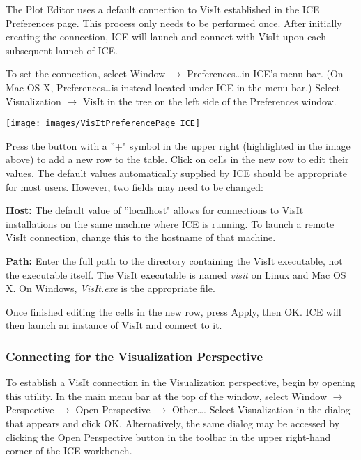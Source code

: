 The Plot Editor uses a default connection to VisIt established in the ICE
Preferences page. This process only needs to be performed once. After initially
creating the connection, ICE will launch and connect with VisIt upon each
subsequent launch of ICE.

To set the connection, select Window $\rightarrow$ Preferences\ldots in ICE's
menu bar. (On Mac OS X, Preferences\ldots is instead located under ICE in the
menu bar.) Select Visualization $\rightarrow$ VisIt in the tree on the left side
of the Preferences window.

\begin{center}
\texttt{[image: images/VisItPreferencePage\_ICE]}
\end{center}

Press the button with a ''+" symbol in the upper right (highlighted in the image
above) to add a new row to the table. Click on cells in the new row to edit
their values. The default values automatically supplied by ICE should be
appropriate for most users. However, two fields may need to be changed:

\textbf{Host:} The default value of ''localhost" allows for connections to VisIt
installations on the same machine where ICE is running. To launch a remote VisIt
connection, change this to the hostname of that machine.

\textbf{Path:} Enter the full path to the directory containing the VisIt
executable, not the executable itself. The VisIt executable is named
\textit{visit} on Linux and Mac OS X. On Windows, \textit{VisIt.exe} is the
appropriate file.

Once finished editing the cells in the new row, press Apply, then OK. ICE will
then launch an instance of VisIt and connect to it.

\subsubsection{Connecting for the Visualization Perspective} 

To establish a VisIt connection in the Visualization perspective, begin by
opening this utility. In the main menu bar at the top of the window, select
Window $\rightarrow$ Perspective $\rightarrow$ Open Perspective $\rightarrow$
Other\ldots. Select Visualization in the dialog that appears and click OK.
Alternatively, the same dialog may be accessed by clicking the Open Perspective
button in the toolbar in the upper right-hand corner of the ICE workbench.

